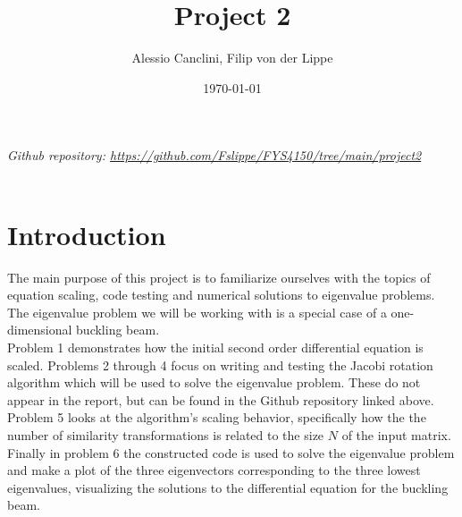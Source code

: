 \documentclass[english,notitlepage]{revtex4-1}  %
\begin{document}
\title{Project 2}
\author{Alessio Canclini, Filip von der Lippe}
\date{\today}
\noaffiliation                            %


\maketitle

\textit{Github repository: \url{https://github.com/Fslippe/FYS4150/tree/main/project2}}
\\
\\
\section*{Introduction}
The main purpose of this project is to familiarize ourselves with the topics
of equation scaling, code testing and numerical solutions to eigenvalue problems. 
The eigenvalue problem we will be working with is a special case of a 
one-dimensional buckling beam. \\
Problem 1 demonstrates how the initial second order differential equation
is scaled. Problems 2 through 4 focus on writing and testing the Jacobi rotation algorithm which
will be used to solve the eigenvalue problem. These do not appear in the report, 
but can be found in the Github repository linked above. Problem 5 looks at the 
algorithm's scaling behavior, specifically how the the number of similarity transformations 
is related to the size $N$ of the input matrix. Finally in problem 6 the constructed code is used 
to solve the eigenvalue problem and make a plot of the three eigenvectors corresponding to the 
three lowest eigenvalues, visualizing the solutions to the differential equation for the buckling beam. \\
\\
\\
\end{document}
